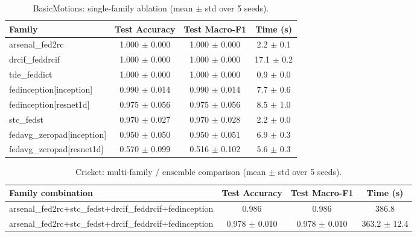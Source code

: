 \begin{table}[t]
\centering
\caption{BasicMotions: single-family ablation (mean $\pm$ std over 5 seeds).}
\label{tab:results_basicmotions_ablation}
\begin{tabular}{lccc}
\toprule
Family & Test Accuracy & Test Macro-F1 & Time (s) \\
\midrule
arsenal\_fed2rc & 1.000 $\pm$ 0.000 & 1.000 $\pm$ 0.000 & 2.2 $\pm$ 0.1 \\
drcif\_feddrcif & 1.000 $\pm$ 0.000 & 1.000 $\pm$ 0.000 & 17.1 $\pm$ 0.2 \\
tde\_feddict & 1.000 $\pm$ 0.000 & 1.000 $\pm$ 0.000 & 0.9 $\pm$ 0.0 \\
fedinception[inception] & 0.990 $\pm$ 0.014 & 0.990 $\pm$ 0.014 & 7.7 $\pm$ 0.6 \\
fedinception[resnet1d] & 0.975 $\pm$ 0.056 & 0.975 $\pm$ 0.056 & 8.5 $\pm$ 1.0 \\
stc\_fedst & 0.970 $\pm$ 0.027 & 0.970 $\pm$ 0.028 & 2.2 $\pm$ 0.0 \\
fedavg\_zeropad[inception] & 0.950 $\pm$ 0.050 & 0.950 $\pm$ 0.051 & 6.9 $\pm$ 0.3 \\
fedavg\_zeropad[resnet1d] & 0.570 $\pm$ 0.099 & 0.516 $\pm$ 0.102 & 5.6 $\pm$ 0.3 \\
\bottomrule
\end{tabular}
\end{table}

\begin{table}[t]
\centering
\caption{Cricket: multi-family / ensemble comparison (mean $\pm$ std over 5 seeds).}
\label{tab:results_cricket_ensemble}
\begin{tabular}{lccc}
\toprule
Family combination & Test Accuracy & Test Macro-F1 & Time (s) \\
\midrule
arsenal\_fed2rc+stc\_fedst+drcif\_feddrcif+fedinception & 0.986 & 0.986 & 386.8 \\
arsenal\_fed2rc+stc\_fedst+drcif\_feddrcif+fedinception & 0.978 $\pm$ 0.010 & 0.978 $\pm$ 0.010 & 363.2 $\pm$ 12.4 \\
\bottomrule
\end{tabular}
\end{table}

